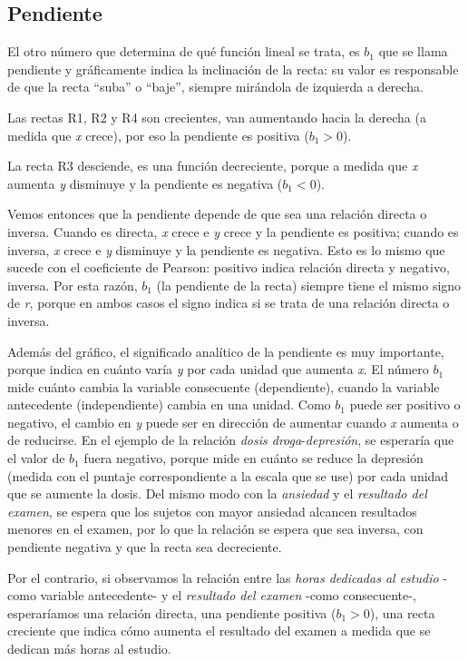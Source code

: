 \documentclass[]{book}
\begin{document}
\hypertarget{pendiente}{%
\subsection{Pendiente}\label{pendiente}}

El otro número que determina de qué función lineal se trata, es \(b_{1}\) que se llama pendiente y gráficamente indica la inclinación de la recta: su valor es responsable de que la recta ``suba'' o ``baje'', siempre mirándola de izquierda a derecha.

Las rectas R1, R2 y R4 son crecientes, van aumentando hacia la derecha (a medida que \emph{x} crece), por eso la pendiente es positiva (\(b_{1} > 0\)).

La recta R3 desciende, es una función decreciente, porque a medida que \emph{x} aumenta \emph{y} disminuye y la pendiente es negativa (\(b_{1} < 0\)).

Vemos entonces que la pendiente depende de que sea una relación directa o inversa. Cuando es directa, \emph{x} crece e \emph{y} crece y la pendiente es positiva; cuando es inversa, \emph{x} crece e \emph{y} disminuye y la pendiente es negativa. Esto es lo mismo que sucede con el coeficiente de Pearson: positivo indica relación directa y negativo, inversa. Por esta razón, \(b_{1}\) (la pendiente de la recta) siempre tiene el mismo signo de \emph{r}, porque en ambos casos el signo indica si se trata de una relación directa o inversa.

Además del gráfico, el significado analítico de la pendiente es muy
importante, porque indica en cuánto varía \emph{y} por cada unidad que
aumenta \emph{x}. El número \(b_{1}\) mide cuánto cambia la variable
consecuente (dependiente), cuando la variable antecedente
(independiente) cambia en una unidad. Como \(b_{1}\) puede ser positivo o
negativo, el cambio en \emph{y} puede ser en dirección de aumentar cuando \emph{x}
aumenta o de reducirse. En el ejemplo de la relación \emph{dosis droga}-\emph{depresión}, se esperaría que el valor de \(b_{1}\) fuera negativo,
porque mide en cuánto se reduce la depresión (medida con el puntaje
correspondiente a la escala que se use) por cada unidad que se aumente
la dosis. Del mismo modo con la \emph{ansiedad} y el \emph{resultado del examen},
se espera que los sujetos con mayor ansiedad alcancen resultados menores
en el examen, por lo que la relación se espera que sea inversa, con
pendiente negativa y que la recta sea decreciente.

Por el contrario, si observamos la relación entre las \emph{horas dedicadas al estudio} -como variable antecedente- y el \emph{resultado del examen} -como consecuente-, esperaríamos una relación directa, una pendiente positiva (\(b_{1} > 0\)), una recta creciente que indica cómo aumenta el resultado del examen a medida que se dedican más horas al estudio.
\end{document}
